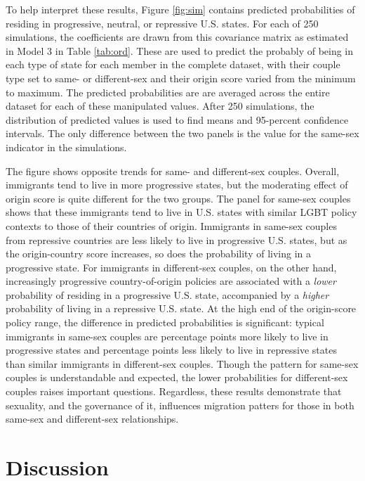 \documentclass[
  11pt,
]{article}
\begin{document}
To help interpret these results, Figure \ref{fig:sim} contains predicted probabilities of residing in progressive, neutral, or repressive U.S. states. For each of 250 simulations, the coefficients are drawn from this covariance matrix as estimated in Model 3 in Table \ref{tab:ord}. These are used to predict the probably of being in each type of state for each member in the complete dataset, with their couple type set to same- or different-sex and their origin score varied from the minimum to maximum. The predicted probabilities are are averaged across the entire dataset for each of these manipulated values. After 250 simulations, the distribution of predicted values is used to find means and 95-percent confidence intervals. The only difference between the two panels is the value for the same-sex indicator in the simulations.

The figure shows opposite trends for same- and different-sex couples. Overall, immigrants tend to live in more progressive states, but the moderating effect of origin score is quite different for the two groups. The panel for same-sex couples shows that these immigrants tend to live in U.S. states with similar LGBT policy contexts to those of their countries of origin. Immigrants in same-sex couples from repressive countries are less likely to live in progressive U.S. states, but as the origin-country score increases, so does the probability of living in a progressive state. For immigrants in different-sex couples, on the other hand, increasingly progressive country-of-origin policies are associated with a \emph{lower} probability of residing in a progressive U.S. state, accompanied by a \emph{higher} probability of living in a repressive U.S. state. At the high end of the origin-score policy range, the difference in predicted probabilities is significant: typical immigrants in same-sex couples are percentage points more likely to live in progressive states and percentage points less likely to live in repressive states than similar immigrants in different-sex couples. Though the pattern for same-sex couples is understandable and expected, the lower probabilities for different-sex couples raises important questions. Regardless, these results demonstrate that sexuality, and the governance of it, influences migration patters for those in both same-sex and different-sex relationships.

\hypertarget{discussion}{%
\section{Discussion}\label{discussion}}
\end{document}
